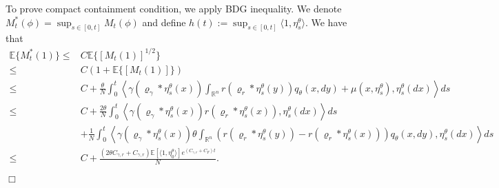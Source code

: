 \documentclass[12pt]{article}
\newenvironment {proof}{{\noindent\bf Proof }}{\hfill $\Box$ \medskip}
\begin{document}
\begin{proof}
To prove compact containment condition, we apply BDG inequality.
We denote $M^{*}_t(\phi)=\sup_{s \in [0,t]}M_t(\phi)$
and define $h(t):=\sup_{s \in [0,t]}\langle 1, \eta^{\theta}_{s} \rangle$.
We have that
\begin{equation}\label{eq: Control quadratic variation}
\begin{aligned}
\mathbb{E}\{M^{*}_t(1)\} \leq & C \mathbb{E}\{[M_t(1)]^{1/2}\}\\
\leq& C (1+\mathbb{E}\{[M_t(1)]\})\\
\leq & C+\frac{\theta}{N}\int_{0}^{t} \left\langle \gamma(\varrho_{\gamma}*\eta^{\theta}_{s}(x))\int_{\mathbb{R}^n}r(\varrho_{r}*\eta^{\theta}_{s}(y)) q_\theta(x,dy)+\mu(x,\eta^{\theta}_{s}), \eta^{\theta}_{s}(dx) \right\rangle ds \\
\leq & C+\frac{2\theta}{N}\int_{0}^{t} \left\langle \gamma(\varrho_{\gamma}*\eta^{\theta}_{s}(x))r(\varrho_{r}*\eta^{\theta}_{s}(x)), \eta^{\theta}_{s}(dx) \right\rangle ds \\
& + \frac{1}{N}\int_{0}^{t} \left\langle \gamma (\varrho_{\gamma}*\eta^{\theta}_{s}(x))\theta\int_{\mathbb{R}^n}\left(r(\varrho_{r}*\eta^{\theta}_{s}(y))-r(\varrho_{r}*\eta^{\theta}_{s}(x))\right) q_\theta(x,dy), \eta^{\theta}_{s}(dx) \right\rangle ds\\
\leq & C+ \frac{(2 \theta C_{\gamma,r}+C_{\gamma,r})\mathbb{E}[\langle 1 ,\eta^{\theta}_{0}\rangle]e^{(C_{\gamma,r}+C_F)t}}{N}.
\end{aligned}
\end{equation}


\end{proof}
\end{document}
